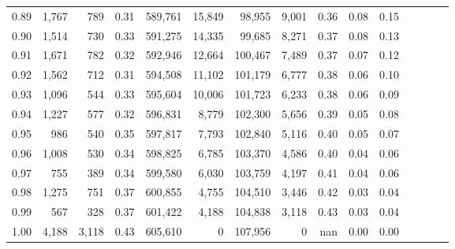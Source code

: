 \begin{tabular}{rrrcrrrrrrrrrrr}
0.89 &   1,767 &    789 &                                       0.31 &  589,761 &   15,849 &   98,955 &    9,001 &  0.36 &  0.08 &                         0.15 \\
0.90 &   1,514 &    730 &                                       0.33 &  591,275 &   14,335 &   99,685 &    8,271 &  0.37 &  0.08 &                         0.13 \\
0.91 &   1,671 &    782 &                                       0.32 &  592,946 &   12,664 &  100,467 &    7,489 &  0.37 &  0.07 &                         0.12 \\
0.92 &   1,562 &    712 &                                       0.31 &  594,508 &   11,102 &  101,179 &    6,777 &  0.38 &  0.06 &                         0.10 \\
0.93 &   1,096 &    544 &                                       0.33 &  595,604 &   10,006 &  101,723 &    6,233 &  0.38 &  0.06 &                         0.09 \\
0.94 &   1,227 &    577 &                                       0.32 &  596,831 &    8,779 &  102,300 &    5,656 &  0.39 &  0.05 &                         0.08 \\
0.95 &     986 &    540 &                                       0.35 &  597,817 &    7,793 &  102,840 &    5,116 &  0.40 &  0.05 &                         0.07 \\
0.96 &   1,008 &    530 &                                       0.34 &  598,825 &    6,785 &  103,370 &    4,586 &  0.40 &  0.04 &                         0.06 \\
0.97 &     755 &    389 &                                       0.34 &  599,580 &    6,030 &  103,759 &    4,197 &  0.41 &  0.04 &                         0.06 \\
0.98 &   1,275 &    751 &                                       0.37 &  600,855 &    4,755 &  104,510 &    3,446 &  0.42 &  0.03 &                         0.04 \\
0.99 &     567 &    328 &                                       0.37 &  601,422 &    4,188 &  104,838 &    3,118 &  0.43 &  0.03 &                         0.04 \\
1.00 &   4,188 &  3,118 &                                       0.43 &  605,610 &        0 &  107,956 &        0 &   nan &  0.00 &                         0.00 \\
\bottomrule
\end{tabular}
